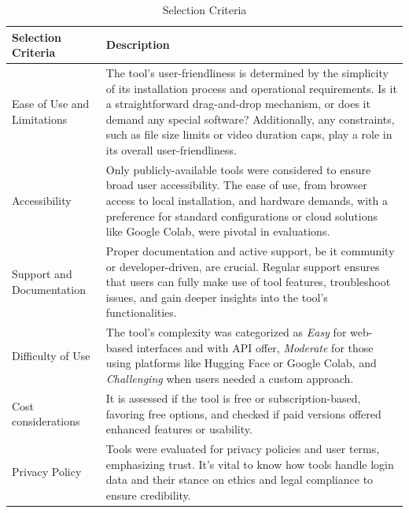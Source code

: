 \begin{table}[htpb]
	\caption{Selection Criteria}\label{tab:selection_criteria}
	\centering
	\small
	\begin{tabularx}{\textwidth}{l X}
		\toprule
		\textbf{Selection Criteria} & \textbf{Description}                                      \\
		\midrule
		Ease of Use and Limitations & The tool's user-friendliness is determined
		by the simplicity of its installation process and operational
		requirements. Is it a straightforward drag-and-drop mechanism, or does
		it demand any special software? Additionally, any constraints, such
		as file size limits or video duration caps, play a role in its overall
		user-friendliness.                                                                      \\
		\addlinespace
		Accessibility               & Only publicly-available tools were considered
		to ensure broad user accessibility. The ease of use, from browser access
		to local installation, and hardware demands, with a preference for
		standard configurations or cloud solutions like Google Colab,
		were pivotal in evaluations.                                                            \\
		\addlinespace
		Support and Documentation   & Proper documentation and active support,
		be it community or developer-driven, are crucial. Regular support
		ensures that users can fully make use of tool features, troubleshoot issues,
		and gain deeper insights into the tool's functionalities.                               \\
		\addlinespace
		Difficulty of Use           & The tool's complexity was categorized as
		\textit{Easy} for web-based interfaces and with \ac{API} offer, \textit{Moderate} for those using
		platforms like Hugging Face or Google Colab, and \textit{Challenging}
		when users needed a custom approach.                                                    \\
		\addlinespace
		Cost considerations         & It is assessed if the tool is free or
		subscription-based, favoring free options, and checked if paid versions
		offered enhanced features or usability.                                                 \\
		\addlinespace
		Privacy Policy              & Tools were evaluated for privacy policies and user terms,
		emphasizing trust. It's vital to know how tools handle login data and their
		stance on ethics and legal compliance to ensure credibility.                            \\
		\bottomrule
	\end{tabularx}
\end{table}

